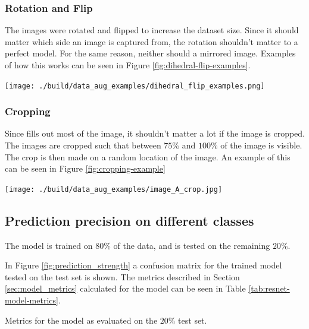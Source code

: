 \subsubsection{Rotation and Flip}
The images were rotated and flipped to increase the dataset size.
Since it should matter which side an image is captured from, 
the rotation shouldn't matter to a perfect model.
For the same reason, neither should a mirrored image.
Examples of how this works can be seen in Figure \ref{fig:dihedral-flip-examples}.
\begin{center}
    \texttt{[image: ./build/data\_aug\_examples/dihedral\_flip\_examples.png]}
    \label{fig:dihedral-flip-examples}
\end{center}

\subsubsection{Cropping}
Since fills out most of the image,
it shouldn't matter a lot if the image is cropped.
The images are cropped such that between $75\%$ and $100\%$ of the image is visible.
The crop is then made on a random location of the image.
An example of this can be seen in Figure \ref{fig:cropping-example}

\begin{center}
    \texttt{[image: ./build/data\_aug\_examples/image\_A\_crop.jpg]}
    \label{fig:cropping-example}
\end{center}


\subsection{Prediction precision on different classes}
The model is trained on $80\%$ of the data, and is tested on the remaining $20\%$.

In Figure \ref{fig:prediction_strength} a confusion matrix for the trained model tested on the test set is shown.
The metrics described in Section \ref{sec:model_metrics} calculated for the model can be seen in Table \ref{tab:resnet-model-metrics}.
\begin{table}
    \centering
    
    \caption{Metrics for the model as evaluated on the $20\%$ test set.}
    \label{tab:resnet-model-metrics}
\end{table}